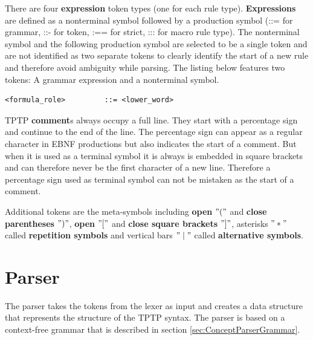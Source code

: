 There are four \textbf{expression} token types (one for each rule type).
\textbf{Expressions} are defined as a nonterminal symbol followed by a production symbol (::= for grammar, ::- for token, :== for strict, ::: for macro rule type).
The nonterminal symbol and the following production symbol are selected to be a single token and are not identified as two separate tokens to clearly identify the start of a new rule and therefore avoid ambiguity while parsing.
The listing below features two tokens: A grammar expression and a nonterminal symbol.
\begin{lstlisting}[caption= TPTP rule example]
<formula_role>         ::= <lower_word>
\end{lstlisting}
\ac{TPTP} \textbf{comment}s always occupy a full line. They start with a percentage sign and continue to the end of the line. The percentage sign can appear as a regular character in \ac{EBNF} productions but also indicates the start of a comment.
But when it is used as  a terminal symbol it is always is embedded in square brackets and can therefore never be the first character of a new line. Therefore a percentage sign used as terminal symbol can not be mistaken as the start of a comment.

Additional tokens are the meta-symbols including \textbf{open} $"("$ and \textbf{close parentheses} $")"$, \textbf{open} $"["$ and \textbf{close square brackets} $"]"$, asterisks $"*"$ called \textbf{repetition symbols} and vertical bars $"\mid"$ called \textbf{alternative symbols}.

\section{Parser}\label{sec:ConceptParser}
The parser takes the tokens from the lexer as input and creates a data structure that represents the structure of the \ac{TPTP} syntax. The parser is based on a context-free grammar that is described in section \ref{sec:ConceptParserGrammar}.

